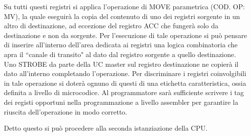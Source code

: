Su tutti questi registri si applica l'operazione di MOVE parametrica (COD. OP: MV), la quale eseguirà la copia del contenuto di uno dei registri sorgente in un altro di destinazione, ad eccezione del registro ACC che fungerà solo da destinazione e non da sorgente. Per l'esecuzione di tale operazione si può pensare di inserire all'interno dell'area dedicata ai registri una logica combinatoria che apra il \textquotedblleft canale di transito" al dato dal registro sorgente a quello destinazione. Uno STROBE da parte della UC master sul registro destinazione ne copierà il dato all'interno completando l'operazione. Per discriminare i registri coinvolgibili in tale operazione si doterà ognuno di questi di una etichetta caratteristica, ossia definita a livello di microcodice. Al programmatore sarà sufficiente scrivere i tag dei registi opportuni nella programmazione a livello assembler per garantire la riuscita dell'operazione in modo corretto.
\par \bigskip \noindent
Detto questo si può procedere alla seconda istanziazione della CPU.